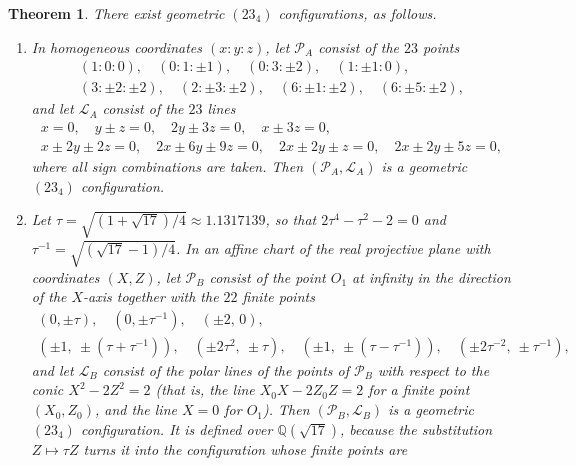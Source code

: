 \documentclass[11pt]{article}
\theoremstyle{plain}
\newtheorem{theorem}{Theorem}
\theoremstyle{definition}
\newcommand{\QQ}{\mathbb{Q}}
\newcommand{\cP}{\mathcal{P}}
\newcommand{\cL}{\mathcal{L}}
\begin{document}
\begin{theorem}\label{thm:main}
There exist geometric $(23_4)$ configurations, as follows.
\begin{enumerate}
\item[(A)] In homogeneous coordinates $(x:y:z)$, let $\cP_A$ consist of the $23$ points
\begin{equation}\label{eq:pointsA}
\begin{gathered}
(1{:}0{:}0),\quad (0{:}1{:}{\pm}1),\quad (0{:}3{:}{\pm}2),\quad (1{:}{\pm}1{:}0),\\
(3{:}{\pm}2{:}{\pm}2),\quad (2{:}{\pm}3{:}{\pm}2),\quad (6{:}{\pm}1{:}{\pm}2),\quad (6{:}{\pm}5{:}{\pm}2),
\end{gathered}
\end{equation}
and let $\cL_A$ consist of the $23$ lines
\begin{equation}\label{eq:linesA}
\begin{gathered}
x=0,\quad y\pm z=0,\quad 2y\pm3z=0,\quad x\pm3z=0,\\
x\pm2y\pm2z=0,\quad 2x\pm6y\pm9z=0,\quad 2x\pm2y\pm z=0,\quad 2x\pm2y\pm5z=0,
\end{gathered}
\end{equation}
where all sign combinations are taken.  Then $(\cP_A,\cL_A)$ is a geometric $(23_4)$ configuration.
\item[(B)] Let $\tau=\sqrt{(1+\sqrt{17})/4}\approx 1.1317139$, so that $2\tau^4-\tau^2-2=0$ and $\tau^{-1}=\sqrt{(\sqrt{17}-1)/4}$.  In an affine chart of the real projective plane with coordinates $(X,Z)$, let $\cP_B$ consist of the point $O_1$ at infinity in the direction of the $X$-axis together with the $22$ finite points
\begin{equation}\label{eq:points}
\begin{gathered}
(0,\pm\tau),\quad (0,\pm\tau^{-1}),\quad (\pm 2,\,0),\\
(\pm 1,\ \pm(\tau+\tau^{-1})),\quad (\pm 2\tau^{2},\ \pm\tau),\quad
(\pm 1,\ \pm(\tau-\tau^{-1})),\quad (\pm 2\tau^{-2},\ \pm\tau^{-1}),
\end{gathered}
\end{equation}
and let $\cL_B$ consist of the polar lines of the points of $\cP_B$ with respect to the conic $X^2-2Z^2=2$ (that is, the line $X_0X-2Z_0Z=2$ for a finite point $(X_0,Z_0)$, and the line $X=0$ for $O_1$).  Then $(\cP_B,\cL_B)$ is a geometric $(23_4)$ configuration.  It is defined over $\QQ(\sqrt{17})$, because the substitution $Z\mapsto\tau Z$ turns it into the configuration whose finite points are
\begin{equation}\label{eq:points17}

\end{equation}
\end{enumerate}
\end{theorem}
\end{document}

